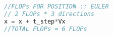 \begin{lstlisting}[language=c++]
//FLOPs FOR POSITION :: EULER
// 2 FLOPs * 3 directions
x = x + t_step*Vx															
//TOTAL FLOPs = 6 FLOPs 
\end{lstlisting}

\pagebreak